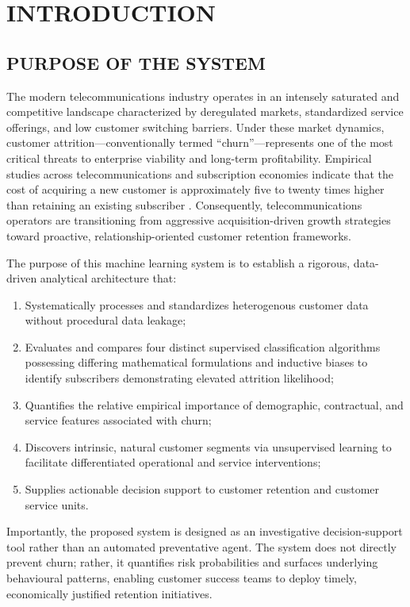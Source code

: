 \chapter{INTRODUCTION}

\section{PURPOSE OF THE SYSTEM}
The modern telecommunications industry operates in an intensely saturated and competitive landscape characterized by deregulated markets, standardized service offerings, and low customer switching barriers. Under these market dynamics, customer attrition---conventionally termed ``churn''---represents one of the most critical threats to enterprise viability and long-term profitability. Empirical studies across telecommunications and subscription economies indicate that the cost of acquiring a new customer is approximately five to twenty times higher than retaining an existing subscriber \citep{coussement2008churn, verbeke2012building}. Consequently, telecommunications operators are transitioning from aggressive acquisition-driven growth strategies toward proactive, relationship-oriented customer retention frameworks.

The purpose of this machine learning system is to establish a rigorous, data-driven analytical architecture that:
\begin{enumerate}
    \item Systematically processes and standardizes heterogenous customer data without procedural data leakage;
    \item Evaluates and compares four distinct supervised classification algorithms possessing differing mathematical formulations and inductive biases to identify subscribers demonstrating elevated attrition likelihood;
    \item Quantifies the relative empirical importance of demographic, contractual, and service features associated with churn;
    \item Discovers intrinsic, natural customer segments via unsupervised learning to facilitate differentiated operational and service interventions;
    \item Supplies actionable decision support to customer retention and customer service units.
\end{enumerate}

Importantly, the proposed system is designed as an investigative decision-support tool rather than an automated preventative agent. The system does not directly prevent churn; rather, it quantifies risk probabilities and surfaces underlying behavioural patterns, enabling customer success teams to deploy timely, economically justified retention initiatives.

